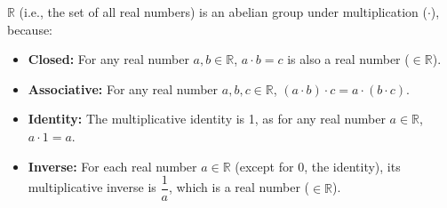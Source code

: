 \noindent $\mathbb{R}$ (i.e., the set of all real numbers) is an abelian group under multiplication ($\cdot$), because: 
\begin{itemize}
\item \textbf{Closed:} For any real number $a, b \in \mathbb{R}$, $a \cdot b = c$ is also a real number ($\in \mathbb{R}$).
\item \textbf{Associative:} For any real number $a, b, c \in \mathbb{R}$, $(a \cdot b) \cdot c = a \cdot (b \cdot c)$.
\item \textbf{Identity:} The multiplicative identity is 1, as for any real number $a \in \mathbb{R}$, $a \cdot 1 = a$.
\item \textbf{Inverse:} For each real number $a \in \mathbb{R}$ (except for 0, the identity), its multiplicative inverse is $\dfrac{1}{a}$, which is a real number ($\in \mathbb{R}$).
\end{itemize}